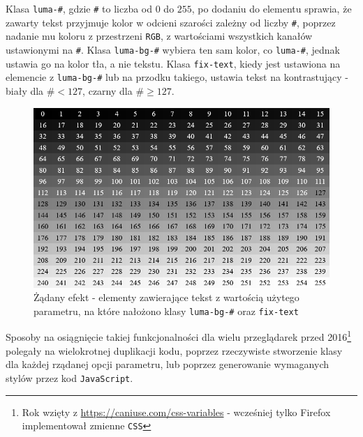 \documentclass[licencjacka]{pracadypl}
\begin{document}
Klasa \texttt{luma-\#}, gdzie \texttt{\#} to liczba od $0$ do $255$, po dodaniu do elementu sprawia, że zawarty tekst przyjmuje kolor w odcieni szarości zależny od liczby \texttt{\#}, poprzez nadanie mu koloru \linebreak z przestrzeni \texttt{RGB}, z wartościami wszystkich kanałów ustawionymi na \texttt{\#}. Klasa \texttt{luma-bg-\#} wybiera ten sam kolor, co \texttt{luma-\#}, jednak ustawia go na kolor tła, a nie tekstu. Klasa \texttt{fix-text}, kiedy jest ustawiona na elemencie z \texttt{luma-bg-\#} lub na przodku takiego, ustawia tekst na kontrastujący - biały dla $\texttt{\#} < 127$, czarny dla $\texttt{\#} \geq 127$.

\begin{figure}[H]
  \centering
  \includegraphics[width=\linewidth/\real{1.2}]{images/ui-luma-grid.png}
  \caption{Żądany efekt - elementy zawierające tekst z wartością użytego parametru, na które nałożono klasy \texttt{luma-bg-\#} oraz \texttt{fix-text}}
  \label{fig:ui-luma-grid}
\end{figure}

Sposoby na osiągnięcie takiej funkcjonalności dla wielu przeglądarek przed 2016\footnote{Rok wzięty z \url{https://caniuse.com/css-variables} - wcześniej tylko Firefox implementował zmienne \texttt{CSS}} polegały na wielokrotnej duplikacji kodu, poprzez rzeczywiste stworzenie klasy dla każdej rządanej opcji parametru, lub poprzez generowanie wymaganych stylów przez kod \texttt{JavaScript}.
\end{document}
